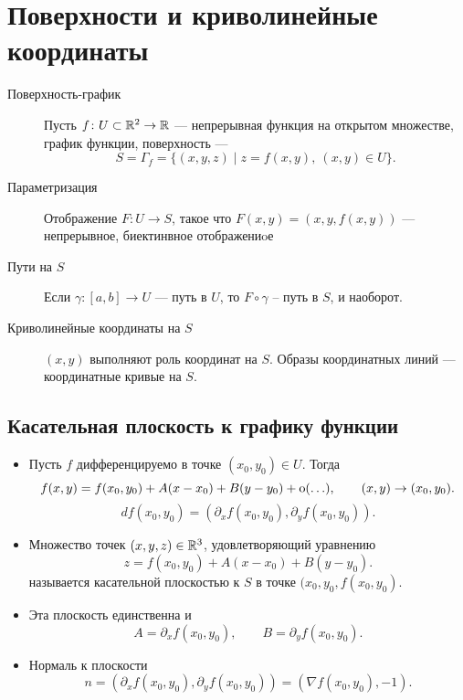 % 
% 
%
\section{Поверхности и криволинейные координаты}
\begin{description}
    \item[Поверхность-график] Пусть $ f \colon U \subset \mathbb{R}^2 \to  \mathbb{R}$ --- непрерывная функция на открытом множестве, график функции, поверхность ---
	\[
	    S = \Gamma _f = \{(x, y, z) \mid z = f(x, y), ~ (x, y) \in U \}
	.\]
    \item  [Параметризация] Отображение $ F\colon U \to  S$, такое что $ F(x, y) = (x, y, f(x, y))$ --- непрерывное, биектинвное отображениoе
    \item [Пути на $ S$] Если  $ \gamma \colon [a, b] \to  U$ --- путь в $ U$, то  $ F \circ \gamma $ -- путь в $ S$, и наоборот.
    \item [Криволинейные координаты на $ S$]  $ (x, y) $ выполняют роль координат на  $ S$. Образы координатных линий --- координатные кривые на  $ S$.
\end{description}
\subsection{Касательная плоскость к графику функции}
\begin{itemize}
    \item Пусть $ f$  дифференцируемо в точке $ (x_0, y_0) \in U$. Тогда
	\[
	    f(x, y) = f(x_0, y_0) + A(x-x_0)+B(y-y_0)+{\mathop{\text{\rm o}}}(\ldots ), \qquad (x, y) \to  (x_0, y_0)
	.\]
	\[
	    df(x_0, y_0) = \left( \partial _xf(x_0, y_0), \partial _yf(x_0, y_0) \right)
	.\]
    \item Множество точек  $ (x, y, z) \in \mathbb{R}^3$, удовлетворяющий уравнению
	\[
	    z = f(x_0, y_0) + A(x-x_0) + B(y-y_0)
	.\]
	называется {\sf касательной плоскостью} к $ S$ в точке  $ (x_0, y_0, f(x_0, y_0)$.
    \item  Эта плоскость единственна и
	\[
	    A= \partial _xf(x_0, y_0) , \qquad B= \partial _yf(x_0, y_0)
	.\]
    \item Нормаль к плоскости
	\[
	    n = \left( \partial _xf(x_0, y_0), \partial _yf(x_0, y_0) \right) = \left( \nabla f(x_0, y_0), -1 \right)
	.\]
\end{itemize}
